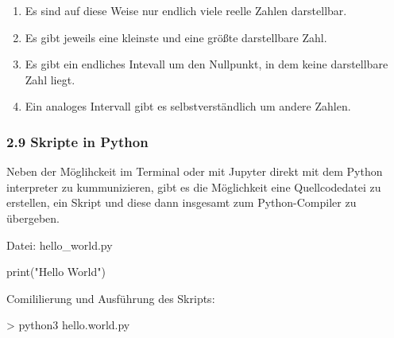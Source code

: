 \documentclass[
  11pt,
  a4paper,
  DIV=11,
  numbers=noendperiod]{scrartcl}
\newenvironment{Shaded}{\begin{snugshade}}{\end{snugshade}}
\newcommand{\BuiltInTok}[1]{\textcolor[rgb]{0.00,0.23,0.31}{#1}}
\newcommand{\NormalTok}[1]{\textcolor[rgb]{0.00,0.23,0.31}{#1}}
\newcommand{\StringTok}[1]{\textcolor[rgb]{0.13,0.47,0.30}{#1}}
\providecommand{\tightlist}{%
  \setlength{\itemsep}{0pt}\setlength{\parskip}{0pt}}\usepackage{longtable,booktabs,array}
\begin{document}
\begin{tcolorbox}[enhanced jigsaw, coltitle=black, left=2mm, opacityback=0, colframe=quarto-callout-important-color-frame, arc=.35mm, colback=white, bottomrule=.15mm, breakable, rightrule=.15mm, colbacktitle=quarto-callout-important-color!10!white, title=\textcolor{quarto-callout-important-color}{\faExclamation}\hspace{0.5em}{Folgerung}, titlerule=0mm, toptitle=1mm, leftrule=.75mm, opacitybacktitle=0.6, bottomtitle=1mm, toprule=.15mm]

\begin{enumerate}
\def\labelenumi{\arabic{enumi}.}
\tightlist
\item
  Es sind auf diese Weise nur endlich viele reelle Zahlen darstellbar.
\item
  Es gibt jeweils eine kleinste und eine größte darstellbare Zahl.
\item
  Es gibt ein endliches Intevall um den Nullpunkt, in dem keine
  darstellbare Zahl liegt.
\item
  Ein analoges Intervall gibt es selbstverständlich um andere Zahlen.
\end{enumerate}

\end{tcolorbox}

\subsubsection{2.9 Skripte in Python}\label{skripte-in-python}

Neben der Möglihckeit im Terminal oder mit Jupyter direkt mit dem Python
interpreter zu kummunizieren, gibt es die Möglichkeit eine
Quellcodedatei zu erstellen, ein Skript und diese dann insgesamt zum
Python-Compiler zu übergeben.

Datei: hello\_world.py

\begin{Shaded}
\begin{Highlighting}[numbers=left,,]
    \BuiltInTok{print}\NormalTok{(}\StringTok{"Hello World"}\NormalTok{)}
\end{Highlighting}
\end{Shaded}

Comililierung und Ausführung des Skripts:

\begin{Shaded}
\begin{Highlighting}[numbers=left,,]
\NormalTok{\textgreater{} python3 hello.world.py}
\end{Highlighting}
\end{Shaded}
\end{document}
